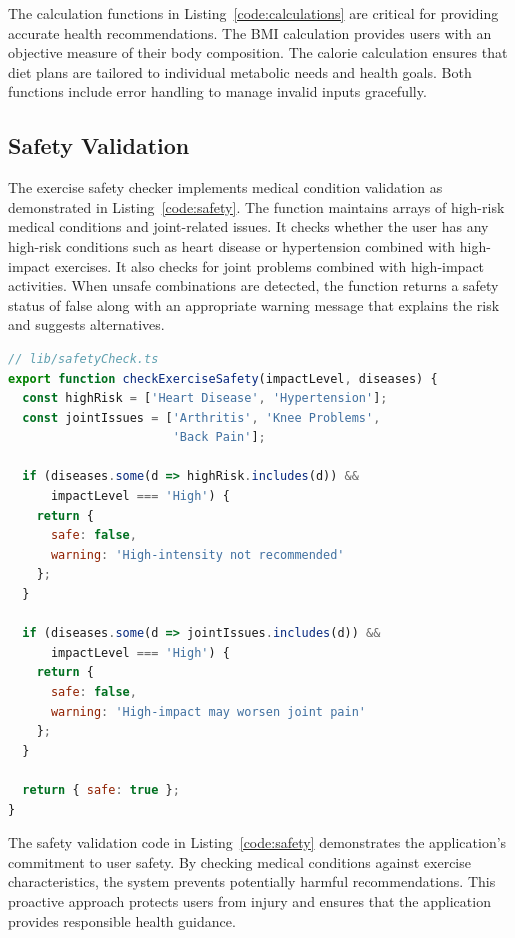 The calculation functions in Listing~\ref{code:calculations} are critical for providing accurate health recommendations. The BMI calculation provides users with an objective measure of their body composition. The calorie calculation ensures that diet plans are tailored to individual metabolic needs and health goals. Both functions include error handling to manage invalid inputs gracefully.

\subsection{Safety Validation}

The exercise safety checker implements medical condition validation as demonstrated in Listing~\ref{code:safety}. The function maintains arrays of high-risk medical conditions and joint-related issues. It checks whether the user has any high-risk conditions such as heart disease or hypertension combined with high-impact exercises. It also checks for joint problems combined with high-impact activities. When unsafe combinations are detected, the function returns a safety status of false along with an appropriate warning message that explains the risk and suggests alternatives.

\begin{lstlisting}[language=JavaScript, caption=Exercise Safety Validation, label=code:safety]
// lib/safetyCheck.ts
export function checkExerciseSafety(impactLevel, diseases) {
  const highRisk = ['Heart Disease', 'Hypertension'];
  const jointIssues = ['Arthritis', 'Knee Problems', 
                       'Back Pain'];
  
  if (diseases.some(d => highRisk.includes(d)) && 
      impactLevel === 'High') {
    return { 
      safe: false, 
      warning: 'High-intensity not recommended' 
    };
  }
  
  if (diseases.some(d => jointIssues.includes(d)) && 
      impactLevel === 'High') {
    return { 
      safe: false, 
      warning: 'High-impact may worsen joint pain' 
    };
  }
  
  return { safe: true };
}
\end{lstlisting}

The safety validation code in Listing~\ref{code:safety} demonstrates the application's commitment to user safety. By checking medical conditions against exercise characteristics, the system prevents potentially harmful recommendations. This proactive approach protects users from injury and ensures that the application provides responsible health guidance.

